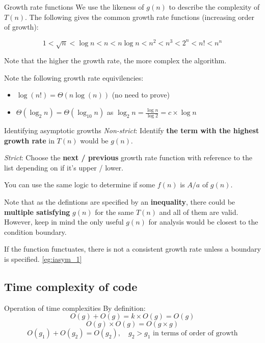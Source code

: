 \begin{knBox}
    {Growth rate functions}
    We use the likeness of $g(n)$ to describe the complexity of $T(n)$. The following gives the common growth rate functions (increasing order of growth):

    \[
        1 < \sqrt{n} < \log n < n < n\log n < n^2 < n^3 < 2^n < n! < n^n
    \]

    Note that the higher the growth rate, the more complex the algorithm.

    Note the following growth rate equivilencies:
    \begin{itemize}
        \item $\log(n!)=\Theta(n\log(n))$ (no need to prove)
        \item $\Theta(\log_2n)=\Theta(\log_{10}n)$ as $\log_2n = \frac{\log n}{\log 2} = c\times\log n$
    \end{itemize}
\end{knBox}

\begin{theorem}
    {Identifying asymptotic growths}
    \textit{Non-strict}: Identify \textbf{the term with the highest growth rate} in $T(n)$ would be $g(n)$.

    \textit{Strict}: Choose the \textbf{next / previous} growth rate function with reference to the list depending on if it's upper / lower.

    You can use the same logic to determine if some $f(n)$ is $A/a$ of $g(n)$.

    Note that as the defintions are specified by an \textbf{inequality}, there could be \textbf{multiple satisfying} $g(n)$ for the same $T(n)$ and all of them are valid. However, keep in mind the only useful $g(n)$ for analysis would be closest to the condition boundary.

    If the function functuates, there is not a consistent growth rate unless a boundary is specified.
    \tcblower
    \label{thm:iasym}
    \ref{eg:iasym_1}
\end{theorem}

\subsection{Time complexity of code}

\begin{knBox}
    {Operation of time complexities}
    By definition:
    \[O(g)+O(g)=k\times O(g)=O(g)\]
    \[O(g)\times O(g)=O(g\times g)\]
    \[O(g_1)+O(g_2)=O(g_2),\quad g_2 > g_1\text{ in terms of order of growth}\]
\end{knBox}

